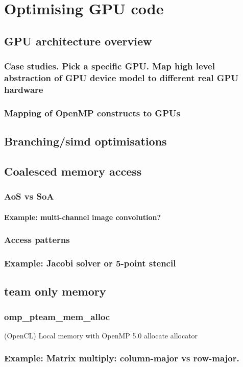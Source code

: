 
%
%
\chapter{Optimising GPU code}

\section{GPU architecture overview}
\subsection{Case studies. Pick a specific GPU. Map high level abstraction of GPU device model to different real GPU hardware}
\subsection{Mapping of OpenMP constructs to GPUs}

%
%

\section{Branching/simd optimisations}

\section{Coalesced memory access}
\subsection{AoS vs SoA}
\subsubsection{Example: multi-channel image convolution?}

\subsection{Access patterns}
\subsection{Example: Jacobi solver or 5-point stencil}

\section{team only memory}
\subsection{omp\_pteam\_mem\_alloc}
(OpenCL) Local memory with OpenMP 5.0 allocate allocator
\subsection{Example: Matrix multiply: column-major vs row-major.}

